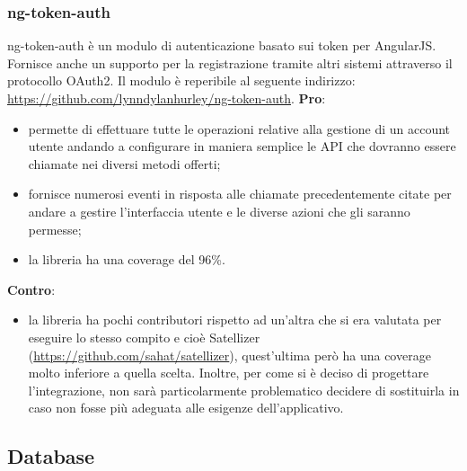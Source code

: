 		\subsubsection{ng-token-auth} %
		\label{ssub:satellizer}
		ng-token-auth è un modulo di autenticazione basato sui token per AngularJS. Fornisce anche un supporto per la registrazione tramite altri sistemi attraverso il protocollo OAuth2. Il modulo è reperibile al seguente indirizzo: \url{https://github.com/lynndylanhurley/ng-token-auth}. \newline
		\textbf{Pro}:
			\begin{itemize}
				\item permette di effettuare tutte le operazioni relative alla gestione di un account utente andando a configurare in maniera semplice le API che dovranno essere chiamate nei diversi metodi offerti;
				\item fornisce numerosi eventi in risposta alle chiamate precedentemente citate per andare a gestire l'interfaccia utente e le diverse azioni che gli saranno permesse;
				\item la libreria ha una coverage del 96\%. 
			\end{itemize}
		\noindent
		\textbf{Contro}:
			\begin{itemize}
				\item la libreria ha pochi contributori rispetto ad un'altra che si era valutata per eseguire lo stesso compito e cioè Satellizer (\url{https://github.com/sahat/satellizer}), quest'ultima però ha una coverage molto inferiore a quella scelta. Inoltre, per come si è deciso di progettare l'integrazione, non sarà particolarmente problematico decidere di sostituirla in caso non fosse più adeguata alle esigenze dell'applicativo.
			\end{itemize}

	\subsection{Database} %
	\label{sub:database}

